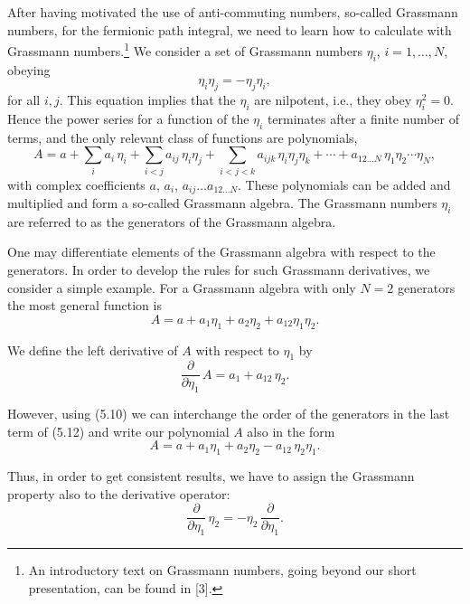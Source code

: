 After having motivated the use of anti-commuting numbers, so-called Grassmann numbers, for the fermionic path integral, we need to learn how to calculate with Grassmann numbers.\footnote{An introductory text on Grassmann numbers, going beyond our short presentation, can be found in [3].} We consider a set of Grassmann numbers
$\eta_i$, $i = 1, \ldots, N$, obeying
\begin{equation}
  \eta_i \eta_j = -\eta_j \eta_i ,
\end{equation}
for all $i, j$. This equation implies that the $\eta_i$ are nilpotent, i.e., they obey
$\eta_i^2 = 0$. Hence the power series for a function of the $\eta_i$ terminates after a finite
number of terms, and the only relevant class of functions are polynomials,
\begin{equation}
  A = a + \sum_i a_i\,\eta_i + \sum_{i<j} a_{ij}\,\eta_i\eta_j
      + \sum_{i<j<k} a_{ijk}\,\eta_i\eta_j\eta_k + \cdots
      + a_{12\ldots N}\,\eta_1\eta_2\cdots\eta_N ,
\end{equation}
with complex coefficients $a$, $a_i$, $a_{ij} \ldots a_{12\ldots N}$. These polynomials can be added
and multiplied and form a so-called Grassmann algebra. The Grassmann numbers $\eta_i$ are referred to as the generators of the Grassmann algebra.

One may differentiate elements of the Grassmann algebra with respect to
the generators. In order to develop the rules for such Grassmann derivatives,
we consider a simple example. For a Grassmann algebra with only $N = 2$
generators the most general function is
\begin{equation}
  A = a + a_1\eta_1 + a_2\eta_2 + a_{12}\eta_1\eta_2 .
\end{equation}

We define the left derivative of $A$ with respect to $\eta_1$ by
\begin{equation}
  \frac{\partial}{\partial\eta_1}\,A = a_1 + a_{12}\,\eta_2 .
\end{equation}

However, using (5.10) we can interchange the order of the generators in the
last term of (5.12) and write our polynomial $A$ also in the form
\begin{equation}
  A = a + a_1\eta_1 + a_2\eta_2 - a_{12}\,\eta_2\eta_1 .
\end{equation}

Thus, in order to get consistent results, we have to assign the Grassmann
property also to the derivative operator:
\begin{equation}
  \frac{\partial}{\partial\eta_1}\,\eta_2 = -\eta_2\,\frac{\partial}{\partial\eta_1} .
\end{equation}

